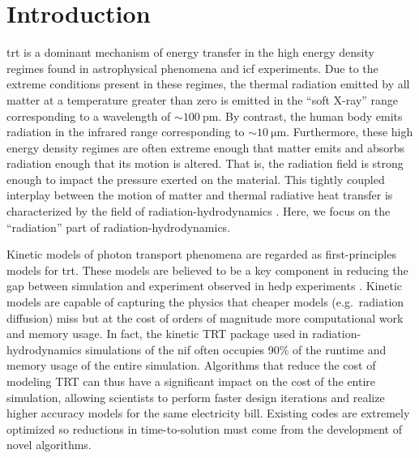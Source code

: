 \documentclass[../doc.tex]{subfiles}
\begin{document}
\chapter{Introduction}
\Gls{trt} is a dominant mechanism of energy transfer in the high energy density regimes found in astrophysical phenomena and \gls{icf} experiments. 
Due to the extreme conditions present in these regimes, the thermal radiation emitted by all matter at a temperature greater than zero is emitted in the ``soft X-ray'' range corresponding to a wavelength of $\sim\!\SI{100}{\pico\meter}$. By contrast, the human body emits radiation in the infrared range corresponding to $\sim\!\SI{10}{\micro\meter}$. 
Furthermore, these high energy density regimes are often extreme enough that matter emits and absorbs radiation enough that its motion is altered. 
That is, the radiation field is strong enough to impact the pressure exerted on the material. This tightly coupled interplay between the motion of matter and thermal radiative heat transfer is characterized by the field of radiation-hydrodynamics \cite{castor2004radiation,mihalas1999foundations}. Here, we focus on the ``radiation'' part of radiation-hydrodynamics. 

Kinetic models of photon transport phenomena are regarded as first-principles models for \gls{trt}. These models are believed to be a key component in reducing the gap between simulation and experiment observed in \gls{hedp} experiments \cite{osti_1460933}.
Kinetic models are capable of capturing the physics that cheaper models (e.g.~radiation diffusion) miss but at the cost of orders of magnitude more computational work and memory usage. 
In fact, the kinetic TRT package used in radiation-hydrodynamics simulations of the \gls{nif} often occupies 90\% of the runtime and memory usage of the entire simulation. Algorithms that reduce the cost of modeling TRT can thus have a significant impact on the cost of the entire simulation, allowing scientists to perform faster design iterations and realize higher accuracy models for the same electricity bill. 
Existing codes are extremely optimized so reductions in time-to-solution must come from the development of novel algorithms. 
\end{document}
